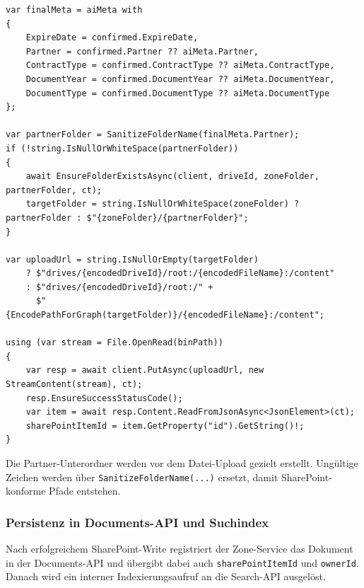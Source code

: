 \begin{lstlisting}[language={[Sharp]C},caption={Commit-Logik mit SharePoint-Upload},label={lst:upload-commit-store}]
var finalMeta = aiMeta with
{
    ExpireDate = confirmed.ExpireDate,
    Partner = confirmed.Partner ?? aiMeta.Partner,
    ContractType = confirmed.ContractType ?? aiMeta.ContractType,
    DocumentYear = confirmed.DocumentYear ?? aiMeta.DocumentYear,
    DocumentType = confirmed.DocumentType ?? aiMeta.DocumentType
};

var partnerFolder = SanitizeFolderName(finalMeta.Partner);
if (!string.IsNullOrWhiteSpace(partnerFolder))
{
    await EnsureFolderExistsAsync(client, driveId, zoneFolder, partnerFolder, ct);
    targetFolder = string.IsNullOrWhiteSpace(zoneFolder) ? partnerFolder : $"{zoneFolder}/{partnerFolder}";
}

var uploadUrl = string.IsNullOrEmpty(targetFolder)
    ? $"drives/{encodedDriveId}/root:/{encodedFileName}:/content"
    : $"drives/{encodedDriveId}/root:/" +
      $"{EncodePathForGraph(targetFolder)}/{encodedFileName}:/content";

using (var stream = File.OpenRead(binPath))
{
    var resp = await client.PutAsync(uploadUrl, new StreamContent(stream), ct);
    resp.EnsureSuccessStatusCode();
    var item = await resp.Content.ReadFromJsonAsync<JsonElement>(ct);
    sharePointItemId = item.GetProperty("id").GetString()!;
}
\end{lstlisting}

Die Partner-Unterordner werden vor dem Datei-Upload gezielt erstellt. Ungültige Zeichen werden über \texttt{SanitizeFolderName(...)} ersetzt, damit SharePoint-konforme Pfade entstehen.

\subsubsection{Persistenz in Documents-API und Suchindex}

Nach erfolgreichem SharePoint-Write registriert der Zone-Service das Dokument in der Documents-API und übergibt dabei auch \texttt{sharePointItemId} und \texttt{ownerId}. Danach wird ein interner Indexierungsaufruf an die Search-API ausgelöst.

